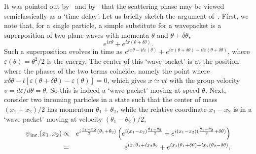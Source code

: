 \documentclass[onecolumn,amsfonts,showpacs,superscriptaddress]{revtex4-1}
\begin{document}
It was pointed out by~\cite{eisenbud1948formal} and by~\cite{wigner1955lower} that the scattering phase may be viewed semiclassically as a `time delay'. Let us briefly sketch the argument of~\cite{wigner1955lower}. First, we note that, for a single particle, a simple substitute for a wavepacket is a superposition of two plane waves with momenta $\theta$ and $\theta + \delta \theta$,
\begin{equation}
	e^{i x \theta   }  + e^{i x (\theta + \delta \theta)  } .
\end{equation}
Such a superposition evolves in time as $e^{i x \theta  - i  t \varepsilon(\theta )  }  + e^{i x (\theta + \delta \theta)  - i  t \varepsilon(\theta + \delta \theta)}$, 
where $\varepsilon(\theta) = \theta^2/2$ is the energy. The center of this `wave packet' is at the position where the phases of the two terms coincide, namely the point where $x \delta \theta  - t [\varepsilon(\theta+\delta \theta) - \varepsilon(\theta)]  = 0$, which gives $x \simeq v t$ with the group velocity $v = d \varepsilon/d \theta = \theta$. So this is indeed a `wave packet' moving at speed $\theta$. Next, consider two incoming particles in a state such that the center of mass $(x_1+x_2)/2$ has momentum $\theta_1+\theta_2$, while the relative coordinate $x_1 - x_2$ is in a `wave packet' moving at velocity $(\theta_1 - \theta_2)/2$,
\begin{eqnarray}
	\label{eq:incoming2}
\nonumber	\psi_{{\rm inc.}} (x_1,x_2) & \propto & e^{i \frac{x_1+x_2}{2} (\theta_1 + \theta_2) } \left( e^{i (x_1 - x_2) \frac{\theta_1 - \theta_2}{2} } + e^{i (x_1 - x_2) ( \frac{\theta_1 - \theta_2}{2} + \delta \theta) } \right)  \\
	& = & e^{i x_1 \theta_1 + i x_2 \theta_2}  + e^{i x_1 (\theta_1 + \delta \theta) + i x_2 (\theta_2 - \delta \theta ) } . 
\end{eqnarray}
\end{document}
